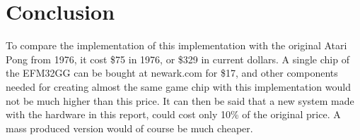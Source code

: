 \section{Conclusion}


To compare the implementation of this implementation with the original Atari
Pong from 1976, it cost \$75 in 1976\cite{pongreview}, or \$329 in current
dollars. A single chip of the EFM32GG can be bought at newark.com for \$17, and
other components needed for creating almost the same game chip with this
implementation would not be much higher than this price. It can then be said
that a new system made with the hardware in this report, could cost only 10\% of
the original price. A mass produced version would of course be much cheaper.
